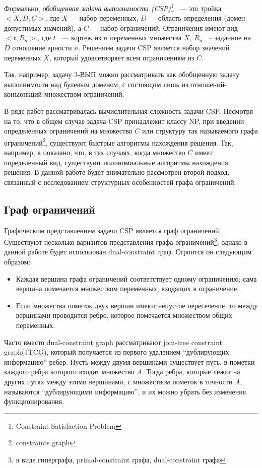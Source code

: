 \documentclass[12pt]{article}
\begin{document}
Формально, \textit{обобщенная задача выполнимости (CSP)}\footnote{Constraint Satisfaction Problem} 
~--- это тройка $<X,D,C>$, где $X$ ~-- набор переменных, $D$ ~-- область определения (домен допустимых значений), 
а $C$ ~-- набор ограничений. Ограничения имеют вид $<t, R_n>$, где $t$ ~--- кортеж из $n$ переменных множества $X$, 
$R_n$ ~-- заданное на $D$ отношение арности $n$. 
Решением задачи CSP является набор значений переменных $X$, который удовлетворяет всем ограничениям из $C$. 

Так, например, задачу 3-ВЫП можно рассматривать как обобщенную задачу выполнимости над булевым доменом, с 
состоящим лишь из отношений-конъюнкций множеством ограничений.

В ряде работ рассматривалась вычислительная сложность задачи CSP. Несмотря на то, что в общем случае задача CSP
принадлежит классу NP, при введении определенных ограничений на множество $C$ или структуру так называемого
графа ограничений\footnote{constraints graph}, существуют быстрые алгоритмы нахождения решения. 
Так, например, в \cite{Shaeffer78} показано, 
что, в тех случаях, когда множество $C$ имеет определенный вид, существуют полиномиальные алгоритмы нахождения решения.
В данной работе будет внимательно рассмотрен второй подход, связанный с исследованием структурных особенностей 
графа ограничений. 

\subsection{Граф ограничений}
Графическим представлением задачи CSP является граф ограничений. 
Существуют несколько вариантов представления графа ограничений\cite{CSP10}\footnote
{в виде гиперграфа, primal-constraint графа, dual-constraint графа}, однако в
данной работе будет использован dual-constraint граф. Строится он следующим образом: 
\begin{itemize}
\item Каждая вершина графа ограничений соответствует одному ограничению; сама вершина помечается множеством переменных, 
входящих в ограничение.
\item Если множества пометок двух вершин имеют непустое пересечение, то между вершинами проводится ребро, которое помечается 
множеством общих переменных.
\end{itemize}

Часто вместо dual-constraint graph рассматривают join-tree constraint graph(JTCG), который получается из первого удалением 
``дублирующих информацию'' ребер. Пусть между двумя вершинами существует путь, 
в пометки каждого ребра которого входит множество $A$. Тогда ребра, которые лежат на других путях между этими вершинами, 
с множеством пометок в точности $A$, называются ``дублирующими информацию'', и их можно убрать без изменения функционирования. 
\end{document}
